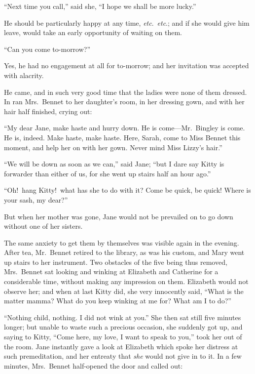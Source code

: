 \documentclass[12pt,english]{book}
\begin{document}
{}``Next time you call,'' said she, {}``I hope we shall be more
lucky.''

He should be particularly happy at any time, \textit{etc}.\ \textit{etc}.;
and if she would give him leave, would take an early opportunity of
waiting on them.

{}``Can you come to-morrow?''\ 

Yes, he had no engagement at all for to-morrow; and her invitation
was accepted with alacrity.

He came, and in such very good time that the ladies were none of them
dressed. In ran Mrs.\ Bennet to her daughter's room, in her dressing
gown, and with her hair half finished, crying out:

{}``My dear Jane, make haste and hurry down. He is come\mbox{---}Mr.\ Bingley
is come. He is, indeed. Make haste, make haste. Here, Sarah, come
to Miss Bennet this moment, and help her on with her gown. Never mind
Miss Lizzy's hair.''

{}``We will be down as soon as we can,'' said Jane; {}``but I dare
say Kitty is forwarder than either of us, for she went up stairs half
an hour ago.''

{}``Oh!\ hang Kitty!\ what has she to do with it? Come be quick,
be quick! Where is your sash, my dear?''\ 

But when her mother was gone, Jane would not be prevailed on to go
down without one of her sisters.

The same anxiety to get them by themselves was visible again in the
evening. After tea, Mr.\ Bennet retired to the library, as was his
custom, and Mary went up stairs to her instrument. Two obstacles of
the five being thus removed, Mrs.\ Bennet sat looking and winking
at Elizabeth and Catherine for a considerable time, without making
any impression on them. Elizabeth would not observe her; and when
at last Kitty did, she very innocently said, {}``What is the matter
mamma? What do you keep winking at me for? What am I to do?''\ 

{}``Nothing child, nothing. I did not wink at you.'' She then sat
still five minutes longer; but unable to waste such a precious occasion,
she suddenly got up, and saying to Kitty, {}``Come here, my love,
I want to speak to you,'' took her out of the room. Jane instantly
gave a look at Elizabeth which spoke her distress at such premeditation,
and her entreaty that \textit{she} would not give in to it. In a few
minutes, Mrs.\ Bennet half-opened the door and called out:
\end{document}

